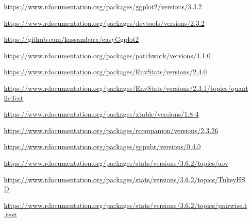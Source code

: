 \documentclass[11pt,a4paper]{article}\usepackage[]{graphicx}\usepackage[]{color}
\begin{document}
\begin{thebibliography}{x}

\url{https://www.rdocumentation.org/packages/ggplot2/versions/3.3.2}

\url{https://www.rdocumentation.org/packages/devtools/versions/2.3.2}

\url{https://github.com/kassambara/easyGgplot2}

\url{https://www.rdocumentation.org/packages/patchwork/versions/1.1.0}

\url{https://www.rdocumentation.org/packages/EnvStats/versions/2.4.0}

\url{https://www.rdocumentation.org/packages/EnvStats/versions/2.3.1/topics/quantileTest}

\url{https://www.rdocumentation.org/packages/xtable/versions/1.8-4}

\url{https://www.rdocumentation.org/packages/rcompanion/versions/2.3.26}

\url{https://www.rdocumentation.org/packages/ggpubr/versions/0.4.0}

\url{https://www.rdocumentation.org/packages/stats/versions/3.6.2/topics/aov}

\url{https://www.rdocumentation.org/packages/stats/versions/3.6.2/topics/TukeyHSD}

\url{https://www.rdocumentation.org/packages/stats/versions/3.6.2/topics/pairwise.t.test}


\end{thebibliography}
\end{document}
